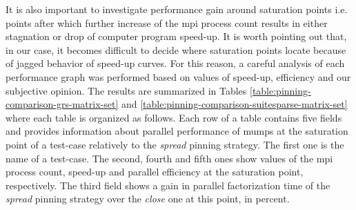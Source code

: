 It is also important to investigate performance gain around saturation points i.e. points after which further increase of the \acrshort{mpi} process count results in either stagnation or drop of computer program speed-up. It is worth pointing out that, in our case, it becomes difficult to decide where saturation points locate because of jagged behavior of speed-up curves. For this reason, a careful analysis of each performance graph was performed based on values of speed-up, efficiency and our subjective opinion. The results are summarized in Tables \ref{table:pinning-comparison-grs-matrix-set} and \ref{table:pinning-comparison-suitesparse-matrix-set} where each table is organized as follows. Each row of a table contains five fields and provides information about parallel performance of \acrshort{mumps} at the saturation point of a test-case relatively to the \textit{spread} pinning strategy. The first one is the name of a test-case. The second, fourth and fifth ones show values of the \acrshort{mpi} process count, speed-up and parallel efficiency at the saturation point, respectively. The third field shows a gain in parallel factorization time of the \textit{spread} pinning strategy over the \textit{close} one at this point, in percent.\\



